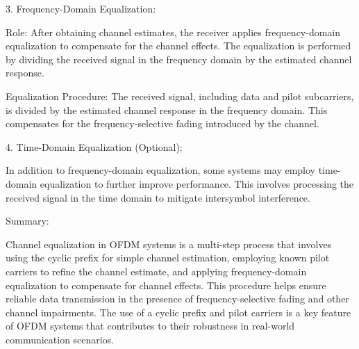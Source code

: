 3. Frequency-Domain Equalization:

Role: After obtaining channel estimates, the receiver applies frequency-domain equalization to compensate for the channel effects. The equalization is performed by dividing the received signal in the frequency domain by the estimated channel response.

Equalization Procedure:
The received signal, including data and pilot subcarriers, is divided by the estimated channel response in the frequency domain.
This compensates for the frequency-selective fading introduced by the channel.

4. Time-Domain Equalization (Optional):

In addition to frequency-domain equalization, some systems may employ time-domain equalization to further improve performance. This involves processing the received signal in the time domain to mitigate intersymbol interference.

Summary:

Channel equalization in OFDM systems is a multi-step process that involves using the cyclic prefix for simple channel estimation, employing known pilot carriers to refine the channel estimate, and applying frequency-domain equalization to compensate for channel effects. This procedure helps ensure reliable data transmission in the presence of frequency-selective fading and other channel impairments. The use of a cyclic prefix and pilot carriers is a key feature of OFDM systems that contributes to their robustness in real-world communication scenarios.


